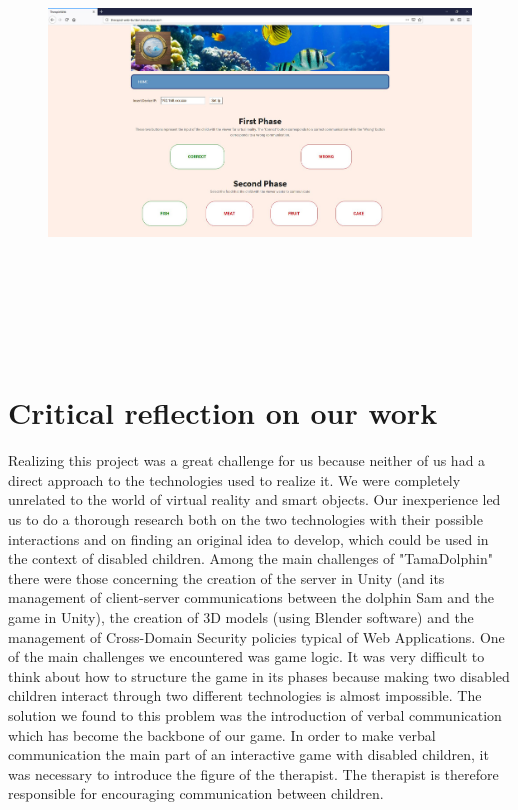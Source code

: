 \documentclass [12pt]{article}
\begin{document}
\begin{figure}[ht!]
\centering
\includegraphics[height=12cm,width=16cm]{Website.jpg}
\end{figure}


\section{Critical reflection on our work}
Realizing this project was a great challenge for us because neither of us had a direct approach to the technologies used to realize it. We were completely unrelated to the world of virtual reality and smart objects. Our inexperience led us to do a thorough research both on the two technologies with their possible interactions and on finding an original idea to develop, which could be used in the context of disabled children. Among the main challenges of "TamaDolphin" there were those concerning the creation of the server in Unity (and its management of client-server communications between the dolphin Sam and the game in Unity), the creation of 3D models (using Blender software) and the management of Cross-Domain Security policies typical of Web Applications. One of the main challenges we encountered was game logic. It was very difficult to think about how to structure the game in its phases because making two disabled children interact through two different technologies is almost impossible. The solution we found to this problem was the introduction of verbal communication which has become the backbone of our game. In order to make verbal communication the main part of an interactive game with disabled children, it was necessary to introduce the figure of the therapist. The therapist is therefore responsible for encouraging  communication between children.
\end{document}
